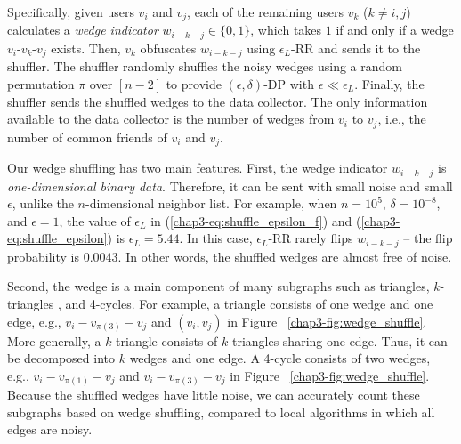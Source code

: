 Specifically, 
given users $v_i$ and $v_j$, 
each of the remaining users $v_k$ ($k \ne i, j$) 
calculates a \textit{wedge indicator} $w_{i-k-j} \in \{0,1\}$, 
which 
takes $1$ if and only if 
a wedge $v_i$-$v_k$-$v_j$ exists. 
Then, $v_k$ obfuscates $w_{i-k-j}$ using $\epsilon_L$-RR and sends it to the shuffler. 
The shuffler randomly shuffles the noisy wedges using a random permutation $\pi$ over $[n-2]$ 
to provide $(\epsilon, \delta)$-DP with $\epsilon \ll \epsilon_L$. 
Finally, the shuffler sends the shuffled wedges to the data collector. 
The only information available to the data collector is  the number of wedges from $v_i$ to $v_j$, i.e., the number of common friends of $v_i$ and $v_j$. 

Our wedge shuffling has two main features. 
First, 
the wedge indicator $w_{i-k-j}$ is \textit{one-dimensional binary data}. 
Therefore, it can be sent with small noise and small $\epsilon$, unlike the $n$-dimensional neighbor list. 
For example, when $n=10^5$, $\delta=10^{-8}$, and $\epsilon=1$, the value of $\epsilon_L$ in (\ref{chap3-eq:shuffle_epsilon_f}) and (\ref{chap3-eq:shuffle_epsilon}) is $\epsilon_L = 5.44$. 
In this case, $\epsilon_L$-RR rarely flips $w_{i-k-j}$ -- the flip probability is $0.0043$. 
In other words, the shuffled wedges are almost free of noise. 

Second, the wedge is a main component of many subgraphs such as triangles, $k$-triangles \cite{Karwa_PVLDB11}, and 4-cycles. 
For example, a triangle consists of one wedge and one edge, e.g., $v_i-v_{\pi(3)}-v_j$ and $(v_i, v_j)$ in Figure ~\ref{chap3-fig:wedge_shuffle}. 
More generally, a $k$-triangle consists of $k$ triangles sharing one edge. 
Thus, it can be decomposed into $k$ wedges and one edge. 
A 4-cycle consists of two wedges, e.g., $v_i-v_{\pi(1)}-v_j$ and $v_i-v_{\pi(3)}-v_j$ in Figure ~\ref{chap3-fig:wedge_shuffle}. 
Because the shuffled wedges have little noise, we can accurately count these subgraphs based on wedge shuffling, compared to local algorithms in which all edges are noisy. 

